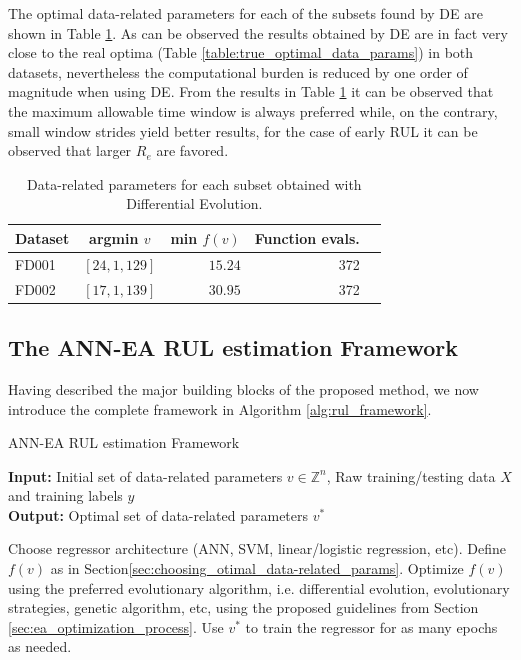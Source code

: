 \documentclass[12pt]{IEEEtran}%
\begin{document}
The optimal data-related parameters for each of the subsets found by DE are shown in Table \ref{table:optimal_data_params}. As can be observed the results obtained by DE are in fact very close to the real optima (Table \ref{table:true_optimal_data_params}) in both datasets, nevertheless the computational burden is reduced by one order of magnitude when using DE. From the results in Table \ref{table:optimal_data_params} it can be observed that the maximum allowable time window is always preferred while, on the contrary, small window strides yield better results, for the case of early RUL it can be observed that larger $R_e$ are favored.

\begin{table}[!htb]
\centering
\begin{tabular}{l | c r r l}
	\hline
	 Dataset & argmin $v$ & min $f(v)$ & Function evals.\\
  	\hline
  	FD001 & $\left[ 24, 1, 129 \right]$ & $15.24$ & 372\\
  	FD002 & $\left[ 17, 1, 139 \right]$ & $30.95$ & 372\\
  	\hline
\end{tabular}
\caption{Data-related parameters for each subset obtained with Differential Evolution.}
\label{table:optimal_data_params}
\end{table}

\subsection{The ANN-EA RUL estimation Framework}

Having described the major building blocks of the proposed method, we now introduce the complete framework in Algorithm \ref{alg:rul_framework}.

\setcounter{algorithm}{0}
\begin{algorithm}[H]
\caption{ANN-EA RUL estimation Framework}\label{alg:rul_framework}
\textbf{Input:} Initial set of data-related parameters $v \in \mathbb{Z}^n$, Raw training/testing data $X$ and training labels $y$\\
\textbf{Output:} Optimal set of data-related parameters $v^*$
	\begin{algorithmic}[1]
		\State Choose regressor architecture (ANN, SVM, linear/logistic regression, etc).
		\State Define $f(v)$ as in Section\ref{sec:choosing_otimal_data-related_params}.
		\State Optimize $f(v)$ using the preferred evolutionary algorithm, i.e. differential evolution, evolutionary strategies, genetic algorithm, etc, using the proposed guidelines from Section \ref{sec:ea_optimization_process}.
		\State Use $v^*$ to train the regressor for as many epochs as needed.
	\end{algorithmic}
\end{algorithm}
\end{document}

